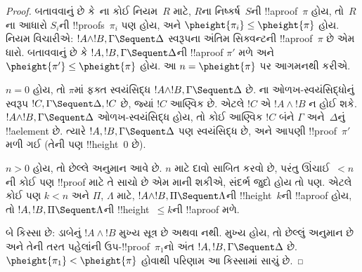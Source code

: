 \documentclass[../../../include/open-logic-section]{subfiles}
\begin{document}
\begin{proof}
બતાવવાનું છે કે~ના કોઈ નિયમ~$R$ માટે,
$R$ના નિષ્કર્ષ~$S$ની !!a{proof}~$\pi$ હોય,
તો~$R$ના આધારો $S_i$ની !!{proof}s~$\pi_i$ પણ હોય,
અને $\pheight{\pi_i} \le \pheight{\pi}$ હોય.
\LeftR{\land} નિયમ વિચારીએ:
$!A \land !B, \Gamma \Sequent \Delta$ સ્વરૂપના
અંતિમ સિક્વન્ટની !!a{proof}~$\pi$ છે એમ ધારો.
બતાવવાનું છે કે $!A, !B, \Gamma \Sequent \Delta$ની
!!a{proof} $\pi'$ મળે અને
$\pheight{\pi'} \le \pheight{\pi}$ હોય.
આ $n = \pheight{\pi}$ પર આગમનથી કરીએ.

$n = 0$ હોય, તો $\pi$માં ફક્ત સ્વયંસિદ્ધ
$!A \land !B, \Gamma \Sequent \Delta$ છે.
ના ઓળખ-સ્વયંસિદ્ધોનું સ્વરૂપ
$!C, \Gamma \Sequent \Delta, !C$ છે, જ્યાં $!C$ આણ્વિક છે.
એટલે $!C$ એ $!A \land !B$ ન હોઈ શકે.
$!A \land !B, \Gamma \Sequent \Delta$ ઓળખ-સ્વયંસિદ્ધ હોય,
તો કોઈ આણ્વિક $!C$ બંને $\Gamma$ અને~$\Delta$નું !!a{element} છે.
ત્યારે $!A, !B, \Gamma \Sequent \Delta$ પણ સ્વયંસિદ્ધ છે,
અને આપણી !!{proof}~$\pi'$ મળી ગઈ
(તેની પણ !!{height}~$0$ છે).

$n>0$ હોય, તો છેલ્લે અનુમાન આવે છે.
$n$ માટે દાવો સાબિત કરવો છે, પરંતુ
ઊંચાઈ~$<n$ની કોઈ પણ !!{proof} માટે તે સાચો છે એમ માની શકીએ,
સંદર્ભ જુદો હોય તો પણ.
એટલે કોઈ પણ $k<n$ અને $\Pi$, $\Lambda$ માટે,
$!A \land !B, \Pi \Sequent \Lambda$ની
!!{height}~$k$ની !!a{proof} હોય,
તો $!A, !B, \Pi \Sequent \Lambda$ની
!!{height}~$\le k$ની !!a{proof} મળે.

બે કિસ્સા છે: ડાબેનું $!A \land !B$ મુખ્ય સૂત્ર છે અથવા નથી.
મુખ્ય હોય, તો છેલ્લું અનુમાન \LeftR{\land} છે
અને તેની તરત પહેલાંની ઉપ-!!{proof}~$\pi_1$નો અંત
$!A, !B, \Gamma \Sequent \Delta$ છે.
$\pheight{\pi_1} < \pheight{\pi}$ હોવાથી પરિણામ આ કિસ્સામાં સાચું છે.


\end{proof}
\end{document}
